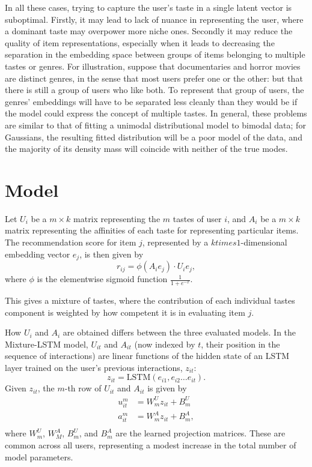 \documentclass[sigchi]{acmart}
\begin{document}
In all these cases, trying to capture the user's taste in a single latent vector is suboptimal. Firstly, it may lead to lack of nuance in representing the user, where a dominant taste may overpower more niche ones. Secondly it may reduce the quality of item representations, especially when it leads to decreasing the separation in the embedding space between groups of items belonging to multiple tastes or genres. For illustration, suppose that documentaries and horror movies are distinct genres, in the sense that most users prefer one or the other: but that there is still a group of users who like both. To represent that group of users, the genres' embeddings will have to be separated less cleanly than they would be if the model could express the concept of multiple tastes. In general, these problems are similar to that of fitting a unimodal distributional model to bimodal data; for Gaussians, the resulting fitted distribution will be a poor model of the data, and the majority of its density mass will coincide with neither of the true modes.

\section{Model}
Let $U_i$ be a $m \times k$ matrix representing the $m$ tastes of user $i$, and $A_i$ be a $m \times k$ matrix representing the affinities of each taste for representing particular items. The recommendation score for item $j$, represented by a $k times 1$-dimensional embedding vector $e_j$, is then given by
\begin{equation}
  r_{ij} = \phi \left(A_ie_j\right) \cdot U_ie_j,
\end{equation}
where $\phi$ is the elementwise sigmoid function $\frac{1}{1 + e^{-x}}$.

This gives a mixture of tastes, where the contribution of each individual tastes component is weighted by how competent it is in evaluating item $j$.

How $U_i$ and $A_i$ are obtained differs between the three evaluated models. In the Mixture-LSTM model, $U_{it}$ and $A_{it}$ (now indexed by $t$, their position in the sequence of interactions) are linear functions of the hidden state of an LSTM layer trained on the user's previous interactions, $z_{it}$:
\begin{equation}
  z_{it} = \mathrm{LSTM}\left(e_{i1}, e_{i2} \ldots e_{it}\right).
\end{equation}
Given $z_{it}$, the $m$-th row of $U_{it}$ and $A_{it}$ is given by
\begin{equation}
\begin{aligned}
  u^m_{it} &= W^U_mz_{it} + B^U_m\\
  a^m_{it} &= W^A_mz_{it} + B^A_m,\\
\end{aligned}
\end{equation}
where $W^U_m$, $W^A_M$, $B^U_m$, and $B^A_m$ are the learned projection matrices. These are common across all users, representing a modest increase in the total number of model parameters.
\end{document}
